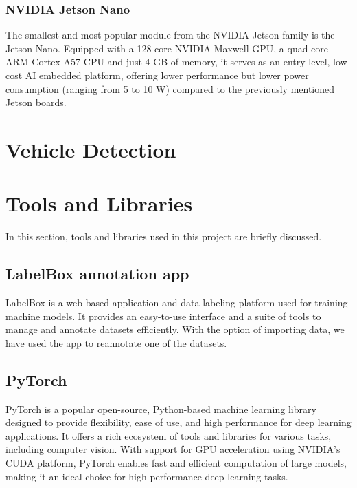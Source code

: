 \subsubsection{NVIDIA Jetson Nano}

The smallest and most popular module from the NVIDIA Jetson family is the Jetson
Nano. Equipped with a 128-core NVIDIA Maxwell GPU, a quad-core ARM Cortex-A57
CPU and just 4 GB of memory, it serves as an entry-level, low-cost AI embedded
platform, offering lower performance but lower power consumption (ranging from 5
to 10 W) compared to the previously mentioned Jetson boards.





\section{Vehicle Detection}







\section{Tools and Libraries}

In this section, tools and libraries used in this project are briefly discussed.


\subsection{LabelBox annotation app}

LabelBox \cite{LabelBox} is a web-based application and data labeling platform used
for training machine models. It provides an easy-to-use interface and a suite
of tools to manage and annotate datasets efficiently. With the option of
importing data, we have used the app to reannotate one of the datasets.


\subsection{PyTorch}

PyTorch \cite{PyTorch} is a popular open-source, Python-based machine learning
library designed to provide flexibility, ease of use, and high performance for
deep learning applications. It offers a rich ecosystem of tools and libraries for
various tasks, including computer vision. With support for GPU acceleration
using NVIDIA's CUDA platform, PyTorch enables fast and efficient computation of
large models, making it an ideal choice for high-performance deep learning
tasks.

